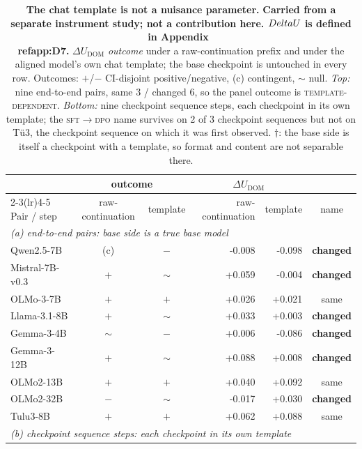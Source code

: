 \begin{table}[t]
\centering
\small
\caption{\textbf{The chat template is not a nuisance parameter.} \textbf{Carried from a separate instrument study; not a contribution here. $\\Delta U$ is defined in Appendix~\\ref{app:D7}.} $\Delta U_{\mathrm{DOM}}$ \emph{outcome} under a raw-continuation prefix and under the aligned model's own chat template; the base checkpoint is untouched in every row. Outcomes: $+$/$-$ CI-disjoint positive/negative, (c) contingent, $\sim$ null. \emph{Top:} nine end-to-end pairs, same 3 / changed 6, so the panel outcome is \textsc{template-dependent}. \emph{Bottom:} nine checkpoint sequence steps, each checkpoint in its own template; the \textsc{sft}$\rightarrow$\textsc{dpo} name survives on 2 of 3 checkpoint sequences but not on T\"u3, the checkpoint sequence on which it was first observed. $\dagger$: the base side is itself a checkpoint with a template, so format and content are not separable there.}
\label{tab:template}
\begin{tabular}{lccrrc}
\toprule
& \multicolumn{2}{c}{outcome} & \multicolumn{2}{c}{$\Delta U_{\mathrm{DOM}}$} & \\
\cmidrule(lr){2-3}\cmidrule(lr){4-5}
Pair / step & raw-continuation & template & raw-continuation & template & name \\
\midrule
\multicolumn{6}{l}{\emph{(a) end-to-end pairs: base side is a true base model}}\\
\quad Qwen2.5-7B & (c) & $-$ & -0.008 & -0.098 & \textbf{changed} \\
\quad Mistral-7B-v0.3 & $+$ & $\sim$ & +0.059 & -0.004 & \textbf{changed} \\
\quad OLMo-3-7B & $+$ & $+$ & +0.026 & +0.021 & same \\
\quad Llama-3.1-8B & $+$ & $\sim$ & +0.033 & +0.003 & \textbf{changed} \\
\quad Gemma-3-4B & $\sim$ & $-$ & +0.006 & -0.086 & \textbf{changed} \\
\quad Gemma-3-12B & $+$ & $\sim$ & +0.088 & +0.008 & \textbf{changed} \\
\quad OLMo2-13B & $+$ & $+$ & +0.040 & +0.092 & same \\
\quad OLMo2-32B & $-$ & $\sim$ & -0.017 & +0.030 & \textbf{changed} \\
\quad Tulu3-8B & $+$ & $+$ & +0.062 & +0.088 & same \\
\midrule
\multicolumn{6}{l}{\emph{(b) checkpoint sequence steps: each checkpoint in its own template}}\\

\end{tabular}
\end{table}
